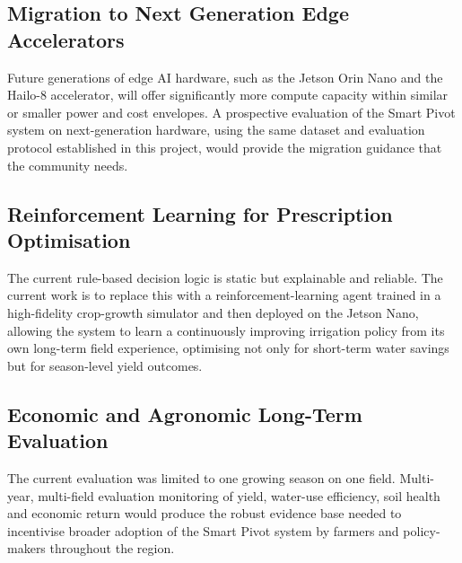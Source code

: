 \documentclass[12pt,a4paper]{report}
\begin{document}
\subsection{Migration to Next Generation Edge Accelerators}

Future generations of edge AI hardware, such as the Jetson Orin Nano and the Hailo-8 accelerator, will offer significantly more compute capacity within similar or smaller power and cost envelopes. A prospective evaluation of the Smart Pivot system on next-generation hardware, using the same dataset and evaluation protocol established in this project, would provide the migration guidance that the community needs.

\subsection{Reinforcement Learning for Prescription Optimisation}

The current rule-based decision logic is static but explainable and reliable. The current work is to replace this with a reinforcement-learning agent trained in a high-fidelity crop-growth simulator and then deployed on the Jetson Nano, allowing the system to learn a continuously improving irrigation policy from its own long-term field experience, optimising not only for short-term water savings but for season-level yield outcomes.

\subsection{Economic and Agronomic Long-Term Evaluation}

The current evaluation was limited to one growing season on one field. Multi-year, multi-field evaluation monitoring of yield, water-use efficiency, soil health and economic return would produce the robust evidence base needed to incentivise broader adoption of the Smart Pivot system by farmers and policy-makers throughout the region.
\end{document}
